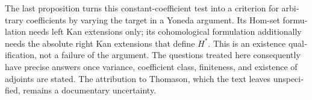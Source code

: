 \begin{otherlanguage}{english}
The last proposition turns this constant-coefficient test into a criterion for arbitrary coefficients by varying the target in a Yoneda argument. Its Hom-set formulation needs left Kan extensions only; its cohomological formulation additionally needs the absolute right Kan extensions that define $H^*$. This is an existence qualification, not a failure of the argument. The questions treated here consequently have precise answers once variance, coefficient class, finiteness, and existence of adjoints are stated. The attribution to Thomason, which the text leaves unspecified, remains a documentary uncertainty.
\end{otherlanguage}
\dgrchunkend
